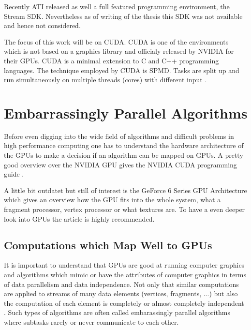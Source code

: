 Recently \gls{ATI} released as well a full featured programming environment, the
Stream \gls{SDK}. Nevertheless as of writing of the thesis this \gls{SDK} was not
available and hence not considered. 


The focus of this work will be on \gls{CUDA}. \Gls{CUDA} is one of the
environments which is not based on a graphics library and officialy released by
\gls{NVIDIA} for their \glspl{GPU}. \Gls{CUDA} is a minimal extension to C and
C++ programming languages. The technique employed by \gls{CUDA} is \gls{SPMD}.
Tasks are split up and run simultaneously on multiple threads (cores) with
different input \citep{citeulike:3072519}.

\section{Embarrassingly Parallel Algorithms} %
\label{ssub:choosing_a_fast_algorithm}
Before even digging into the wide field of algorithms and difficult problems in
high performance computing one has to understand the hardware architecture of
the \glspl{GPU} to make a decision if an algorithm can be mapped on \glspl{GPU}.
A pretty good overview over the \gls{NVIDIA} \gls{GPU} gives the 
\gls{NVIDIA} \gls{CUDA} programming guide \citep{citeulike:3325943}. 

A little bit outdatet but still of interest is the GeForce 6 Series
\gls{GPU} Architecture \citep{citeulike:3757915} which gives an overview how the
\gls{GPU} fits into the whole system, what a fragment processor, vertex
processor or what textures are. To have a even deeper look into \glspl{GPU} the
article \citep{citeulike:2790995} is highly recommended.

\subsection{Computations which Map Well to GPUs} %
\label{par:computations_which_map_well_to_GPUs}
It is important to understand that \glspl{GPU} are good at running computer
graphics and algorithms which mimic or have the attributes of computer graphics
in terms of data parallelism and data independence. Not only that similar
computations are applied to streams of many data elements (vertices, fragments,
...) but also the computation of each element is completely or almost completely
independent \citep{citeulike:3733428}. Such types of algorithms are often called
embarassingly parallel algorithms where subtasks rarely or never communicate to
each other.

